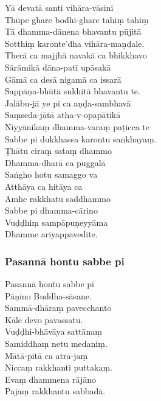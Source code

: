 
\enlargethispage{\baselineskip}

Yā devatā santi vihāra-vāsinī\\
Thūpe ghare bodhi-ghare tahiṃ tahiṃ\\
Tā dhamma-dānena bhavantu pūjitā\\
Sotthiṃ karonte'dha vihāra-maṇḍale.\\
Therā ca majjhā navakā ca bhikkhavo\\
Sārāmikā dāna-patī upāsakā\\
Gāmā ca desā nigamā ca issarā\\
Sappāṇa-bhūtā sukhitā bhavantu te.\\
Jalābu-jā ye pi ca aṇḍa-sambhavā\\
Saṃseda-jātā atha-v-opapātikā\\
Niyyānikaṃ dhamma-varaṃ paṭicca te\\
Sabbe pi dukkhassa karontu saṅkhayaṃ.\\
Ṭhātu ciraṃ sataṃ dhammo\\
Dhamma-dharā ca puggalā\\
Saṅgho hotu samaggo va\\
Atthāya ca hitāya ca\\
Amhe rakkhatu saddhammo\\
Sabbe pi dhamma-cārino\\
Vuḍḍhiṃ sampāpuṇeyyāma\\
Dhamme ariyappavedite.

\subsubsection{Pasannā hontu sabbe pi}



Pasannā hontu sabbe pi\\
Pāṇino Buddha-sāsane.\\
Sammā-dhāraṃ pavecchanto\\
Kāle devo pavassatu.\\
Vuḍḍhi-bhāvāya sattānaṃ\\
Samiddhaṃ netu medaniṃ.\\
Mātā-pitā ca atra-jaṃ\\
Niccaṃ rakkhanti puttakaṃ.\\
Evaṃ dhammena rājāno\\
Pajaṃ rakkhantu sabbadā.

